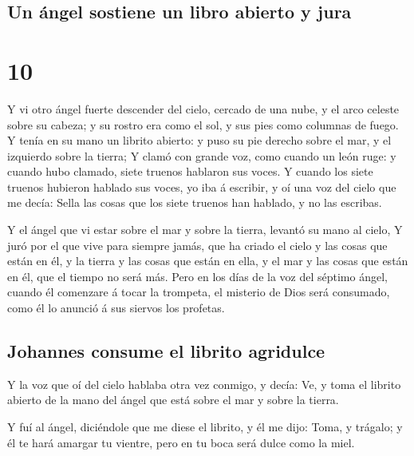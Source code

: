 \hypertarget{un-uxe1ngel-sostiene-un-libro-abierto-y-jura}{%
\subsection{Un ángel sostiene un libro abierto y
jura}\label{un-uxe1ngel-sostiene-un-libro-abierto-y-jura}}

\hypertarget{section-66-10}{%
\section{10}\label{section-66-10}}

 Y vi otro ángel fuerte descender del cielo, cercado de
una nube, y el arco celeste sobre su cabeza; y su rostro era como el
sol, y sus pies como columnas de fuego.  Y tenía en su
mano un librito abierto: y puso su pie derecho sobre el mar, y el
izquierdo sobre la tierra;  Y clamó con grande voz, como
cuando un león ruge: y cuando hubo clamado, siete truenos hablaron sus
voces.  Y cuando los siete truenos hubieron hablado sus
voces, yo iba á escribir, y oí una voz del cielo que me decía: Sella las
cosas que los siete truenos han hablado, y no las escribas.

 Y el ángel que vi estar sobre el mar y sobre la tierra,
levantó su mano al cielo,  Y juró por el que vive para
siempre jamás, que ha criado el cielo y las cosas que están en él, y la
tierra y las cosas que están en ella, y el mar y las cosas que están en
él, que el tiempo no será más.  Pero en los días de la voz
del séptimo ángel, cuando él comenzare á tocar la trompeta, el misterio
de Dios será consumado, como él lo anunció á sus siervos los profetas.

\hypertarget{johannes-consume-el-librito-agridulce}{%
\subsection{Johannes consume el librito
agridulce}\label{johannes-consume-el-librito-agridulce}}

 Y la voz que oí del cielo hablaba otra vez conmigo, y
decía: Ve, y toma el librito abierto de la mano del ángel que está sobre
el mar y sobre la tierra.

 Y fuí al ángel, diciéndole que me diese el librito, y él
me dijo: Toma, y trágalo; y él te hará amargar tu vientre, pero en tu
boca será dulce como la miel.

